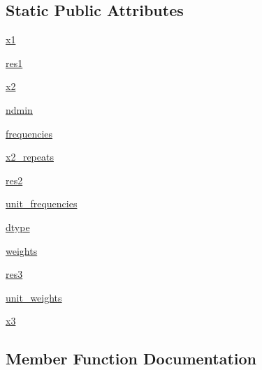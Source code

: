\subsection*{Static Public Attributes}
\begin{DoxyCompactItemize}
\item 
\hyperlink{classnumpy_1_1lib_1_1tests_1_1test__function__base_1_1TestCov_a15d11db25a674198233bf3552be32f2c}{x1}
\item 
\hyperlink{classnumpy_1_1lib_1_1tests_1_1test__function__base_1_1TestCov_a546d5fc947388cbb4fd6c8288b01e841}{res1}
\item 
\hyperlink{classnumpy_1_1lib_1_1tests_1_1test__function__base_1_1TestCov_a91d60570ad764c83b068ca77faf0cad7}{x2}
\item 
\hyperlink{classnumpy_1_1lib_1_1tests_1_1test__function__base_1_1TestCov_a6758133245fcd903245f6858b664c543}{ndmin}
\item 
\hyperlink{classnumpy_1_1lib_1_1tests_1_1test__function__base_1_1TestCov_a8ad6086b06393fffcf274f6a679a116c}{frequencies}
\item 
\hyperlink{classnumpy_1_1lib_1_1tests_1_1test__function__base_1_1TestCov_a572342cd8d6bbf81fc7a1e2a2af3872c}{x2\+\_\+repeats}
\item 
\hyperlink{classnumpy_1_1lib_1_1tests_1_1test__function__base_1_1TestCov_aca89737b0ea1354f430e9cc5b66f9884}{res2}
\item 
\hyperlink{classnumpy_1_1lib_1_1tests_1_1test__function__base_1_1TestCov_a7b61fd0f7c8881d726a35d160cffe44f}{unit\+\_\+frequencies}
\item 
\hyperlink{classnumpy_1_1lib_1_1tests_1_1test__function__base_1_1TestCov_ae4dc91fd5bfed3b4c41eda62a2168dd8}{dtype}
\item 
\hyperlink{classnumpy_1_1lib_1_1tests_1_1test__function__base_1_1TestCov_a0e16a589d8f5860c0c06c8aab440a715}{weights}
\item 
\hyperlink{classnumpy_1_1lib_1_1tests_1_1test__function__base_1_1TestCov_a4418b88c81b7af7af2a09936fc7a3364}{res3}
\item 
\hyperlink{classnumpy_1_1lib_1_1tests_1_1test__function__base_1_1TestCov_a9c471c034360b6684c2ab51bb2dd0d78}{unit\+\_\+weights}
\item 
\hyperlink{classnumpy_1_1lib_1_1tests_1_1test__function__base_1_1TestCov_a2449df20c5452ab501aa093f9b82390f}{x3}
\end{DoxyCompactItemize}


\subsection{Member Function Documentation}
\mbox{\label{classnumpy_1_1lib_1_1tests_1_1test__function__base_1_1TestCov_a2681dd63fd26942a63d297423c7494e2}} 
